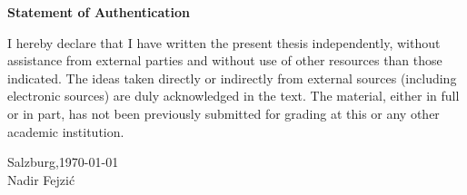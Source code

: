 \documentclass[12pt]{article}
\begin{document}
\newpage

\printbibliography

\newpage

\vspace*{\fill}
\begin{center}
    \textbf{\Huge Statement of Authentication}\\
\end{center}

\vspace{1cm}

I hereby declare that I have written the present thesis independently, without
assistance from external parties and without use of other resources than those
indicated. The ideas taken directly or indirectly from external sources
(including electronic sources) are duly acknowledged in the text. The material,
either in full or in part, has not been previously submitted for grading at
this or any other academic institution.\\

\vspace{1cm}

Salzburg,\today \hspace{0.5cm}\hrulefill\\
\vspace{-0.5cm}
\flushright Nadir Fejzić

\vspace*{\fill}
\end{document}
